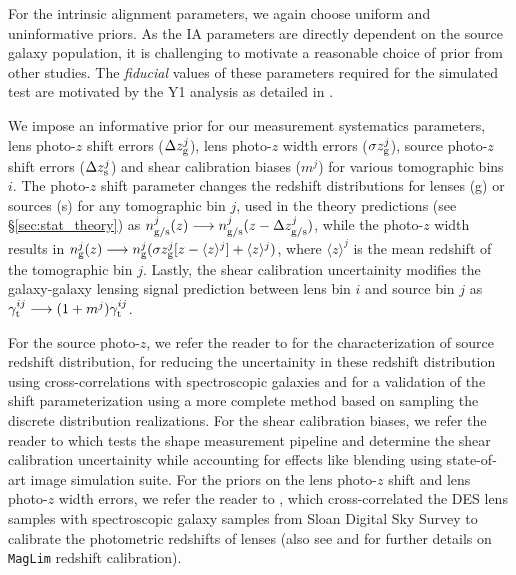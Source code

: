 \documentclass[aps, prd,twocolumn,superscriptaddress,nofootinbib,preprintnumbers]{revtex4-1}
\newcommand{\maglim}{\texttt{MagLim} }
\begin{document}
For the intrinsic alignment parameters, we again choose uniform and uninformative priors. As the IA parameters are directly dependent on the source galaxy population, it is challenging to motivate a reasonable choice of prior from other studies. The \textit{fiducial} values of these parameters required for the simulated test are motivated by the Y1 analysis as detailed in \cite{Samuroff_2019}.




We impose an informative prior for our measurement systematics parameters, lens photo-$z$ shift errors ($\Delta z^j_{\rm g}$), lens photo-$z$ width errors ($\sigma z^j_{\rm g}$), source photo-$z$ shift errors ($\Delta z^j_{\rm s}$) and shear calibration biases ($m^j$) for various tomographic bins $i$. The photo-$z$ shift parameter changes the redshift distributions for lenses (g) or sources (s) for any tomographic bin $j$, used in the theory predictions (see \S\ref{sec:stat_theory}) as $n^j_{\rm g/s}(z) \longrightarrow n^j_{\rm g/s}(z - \Delta z^j_{\rm g/s})$, while the photo-$z$ width results in  $n^j_{\rm g}(z) \longrightarrow n^j_{\rm g}(\sigma z^j_{\rm g}[z - \langle z \rangle^j] + \langle z \rangle^j)$, where $\langle z \rangle^j$ is the mean redshift of the tomographic bin $j$. Lastly, the shear calibration uncertainity modifies the galaxy-galaxy lensing signal prediction between lens bin $i$ and source bin $j$ as $\gamma^{ij}_{\rm t} \longrightarrow (1 + m^j)\gamma^{ij}_{\rm t}$. 


For the source photo-$z$, we refer the reader to \citet*{y3-sompz} for the characterization of source redshift distribution, \citet*{y3-sourcewz} for reducing the uncertainity in these redshift distribution using cross-correlations with spectroscopic galaxies and \citet*{y3-hyperrank} for a validation of the shift parameterization using a more complete method based on sampling the discrete distribution realizations. For the shear calibration biases, we refer the reader to \citet{y3-imagesims} which tests the shape measurement pipeline and determine the shear calibration uncertainity while accounting for effects like blending using state-of-art image simulation suite. For the priors on the lens photo-$z$ shift and lens photo-$z$ width errors, we refer the reader to \citet*{y3-lenswz}, which cross-correlated the DES lens samples with spectroscopic galaxy samples from Sloan Digital Sky Survey to calibrate the photometric redshifts of lenses (also see \citet{y3-2x2ptaltlensresults} and \citet{y3-2x2ptaltlenssompz} for further details on \maglim redshift calibration). 
\end{document}
